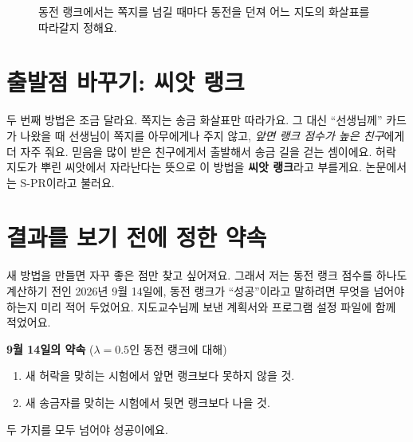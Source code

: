 \begin{figure}[h]
\centering
{}
\caption{동전 랭크에서는 쪽지를 넘길 때마다 동전을 던져 어느 지도의 화살표를 따라갈지 정해요.}
\end{figure}

\section{출발점 바꾸기: 씨앗 랭크}

두 번째 방법은 조금 달라요.
쪽지는 송금 화살표만 따라가요.
그 대신 “선생님께” 카드가 나왔을 때 선생님이 쪽지를 아무에게나 주지 않고,
\emph{앞면 랭크 점수가 높은 친구}에게 더 자주 줘요.
믿음을 많이 받은 친구에게서 출발해서 송금 길을 걷는 셈이에요.
허락 지도가 뿌린 씨앗에서 자라난다는 뜻으로 이 방법을 \textbf{씨앗 랭크}라고 부를게요.
논문에서는 S-PR이라고 불러요.

\section{결과를 보기 전에 정한 약속}

새 방법을 만들면 자꾸 좋은 점만 찾고 싶어져요.
그래서 저는 동전 랭크 점수를 하나도 계산하기 전인 2026년 9월 14일에,
동전 랭크가 “성공”이라고 말하려면 무엇을 넘어야 하는지 미리 적어 두었어요.
지도교수님께 보낸 계획서와 프로그램 설정 파일에 함께 적었어요.

\begin{center}
\begin{tcolorbox}[colback=white, colframe=inkblue, boxrule=0.8pt, arc=2mm, width=0.92\linewidth]
\small
\textbf{9월 14일의 약속} \quad ($\lambda = 0.5$인 동전 랭크에 대해)
\begin{enumerate}
\item 새 허락을 맞히는 시험에서 앞면 랭크보다 못하지 않을 것.
\item 새 송금자를 맞히는 시험에서 뒷면 랭크보다 나을 것.
\end{enumerate}
두 가지를 모두 넘어야 성공이에요.
\end{tcolorbox}
\end{center}

